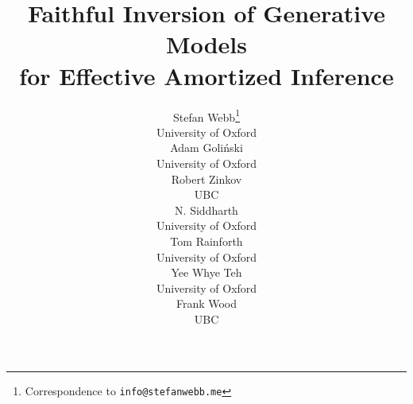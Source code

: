 \documentclass{article}
\title{Faithful Inversion of Generative Models\\ for Effective Amortized Inference}
\author{
  Stefan Webb\thanks{Correspondence to \texttt{info@stefanwebb.me}} \\
  University of Oxford \\
  \And
  Adam Goli\'{n}ski \\
  University of Oxford \\
  \And
  Robert Zinkov \\
  UBC \\
  \AND
  N. Siddharth \\
  University of Oxford \\
  \And
  Tom Rainforth \\
  University of Oxford \\
  \And
  Yee Whye Teh \\
  University of Oxford \\
  \And
  Frank Wood \\
  UBC \\
}
\begin{document}
\suppressfloats

\setlength{\abovedisplayskip}{3.5pt}
\setlength{\belowdisplayskip}{3.5pt}
\setlength{\abovedisplayshortskip}{3.5pt}
\setlength{\belowdisplayshortskip}{3.5pt}	

\maketitle

\begin{abstract}
  
\end{abstract}









\vfill\pagebreak




\end{document}
